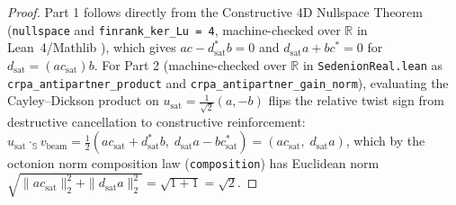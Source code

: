 \documentclass[11pt,a4paper]{article}
\theoremstyle{definition}
\theoremstyle{remark}
\newcommand{\R}{\mathbb{R}}
\newcommand{\Se}{\mathbb{S}}
\begin{document}
\begin{proof}
Part 1 follows directly from the Constructive 4D Nullspace Theorem (\texttt{nullspace} and \texttt{finrank\_ker\_Lu = 4}, machine-checked over $\R$ in Lean~4/Mathlib \cite{Agourakis2026PG32}), which gives $a c - d_{\mathrm{sat}}^* b = 0$ and $d_{\mathrm{sat}} a + b c^* = 0$ for $d_{\mathrm{sat}} = (a c_{\mathrm{sat}})b$. For Part 2 (machine-checked over $\R$ in \texttt{SedenionReal.lean} as \texttt{crpa\_antipartner\_product} and \texttt{crpa\_antipartner\_gain\_norm}), evaluating the Cayley--Dickson product on $u_{\mathrm{sat}} = \frac{1}{\sqrt{2}}(a, -b)$ flips the relative twist sign from destructive cancellation to constructive reinforcement: $u_{\mathrm{sat}} \cdot_{\Se} v_{\mathrm{beam}} = \frac{1}{2}(a c_{\mathrm{sat}} + d_{\mathrm{sat}}^* b, \; d_{\mathrm{sat}} a - b c_{\mathrm{sat}}^*) = (a c_{\mathrm{sat}}, \; d_{\mathrm{sat}} a)$, which by the octonion norm composition law (\texttt{composition}) has Euclidean norm $\sqrt{\|a c_{\mathrm{sat}}\|_2^2 + \|d_{\mathrm{sat}} a\|_2^2} = \sqrt{1 + 1} = \sqrt{2}$.
\end{proof}
\end{document}
